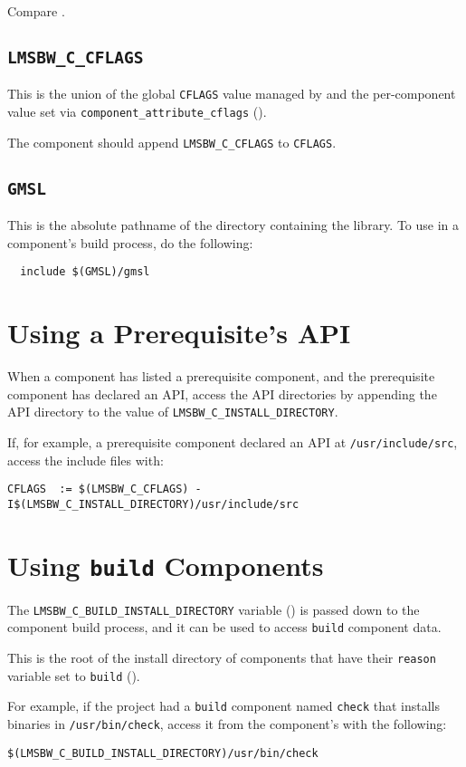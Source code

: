 Compare .

\subsection{\texttt{LMSBW\_C\_CFLAGS}}

This is the union of the global \texttt{CFLAGS} value managed by
\lmsbw and the per-component value set via
\texttt{\texttt{component\_attribute\_cflags}} ().

The component \makefile should append \texttt{LMSBW\_C\_CFLAGS} to
\texttt{CFLAGS}.

\subsection{\texttt{GMSL}}

This is the absolute pathname of the directory containing the \gmsl
library.  To use \gmsl in a component's build process, do the
following:

\begin{verbatim}
  include $(GMSL)/gmsl
\end{verbatim}

\section{Using a Prerequisite's API}\label{wrap:using-prerequisite-api}

When a component has listed a prerequisite component, and the
prerequisite component has declared an API, access the API directories
by appending the API directory to the value of
\texttt{LMSBW\_C\_INSTALL\_DIRECTORY}.

If, for example, a prerequisite component declared an API at
\texttt{/usr/include/src}, access the include files with:

\begin{footnotesize}
\begin{verbatim}
CFLAGS  := $(LMSBW_C_CFLAGS) -I$(LMSBW_C_INSTALL_DIRECTORY)/usr/include/src
\end{verbatim}
\end{footnotesize}

\section{Using \texttt{build} Components}\label{wrap:using-build-components}

The \texttt{LMSBW\_C\_BUILD\_INSTALL\_DIRECTORY} variable
() is passed down to the component
build process, and it can be used to access \texttt{build} component
data.

This is the root of the install directory of components that have
their \texttt{reason} variable set to \texttt{build}
().

For example, if the project had a \texttt{build} component named
\texttt{check} that installs binaries in \texttt{/usr/bin/check},
access it from the component's \makefile with the following:

\begin{verbatim}
$(LMSBW_C_BUILD_INSTALL_DIRECTORY)/usr/bin/check
\end{verbatim}
